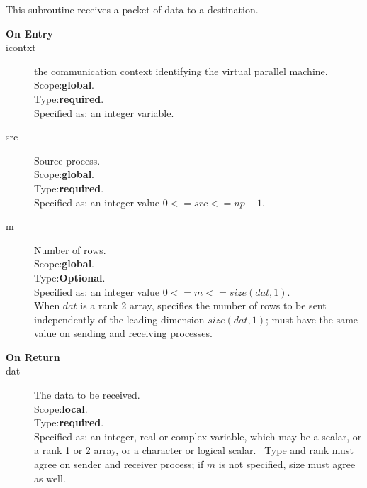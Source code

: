 This subroutine receives a packet of data to a destination.
\begin{description}
\item[\bf  On Entry ]
\item[icontxt] the communication context identifying the virtual
  parallel machine.\\
Scope:{\bf global}.\\
Type:{\bf required}.\\
Specified as: an integer variable.
\item[src] Source process.\\
Scope:{\bf global}.\\
Type:{\bf required}.\\
Specified as: an integer value $0<= src <= np-1$. \\
\item[m] Number of rows.\\
Scope:{\bf global}.\\
Type:{\bf Optional}.\\
Specified as: an integer value $0<= m <= size(dat,1)$. \\
When $dat$ is a rank 2 array, specifies the number of rows to be sent
independently of the leading dimension $size(dat,1)$; must have the
same value on sending and receiving processes.
\end{description}


\begin{description}
\item[\bf On Return]
\item[dat] The data to be received.\\
Scope:{\bf local}.\\
Type:{\bf required}.\\
Specified as: an integer, real or complex variable, which may be a
scalar, or a rank 1 or 2 array, or a character or logical scalar. \
Type and  rank must agree on sender and receiver process; if $m$ is
not specified, size must agree as well. 
\end{description}

